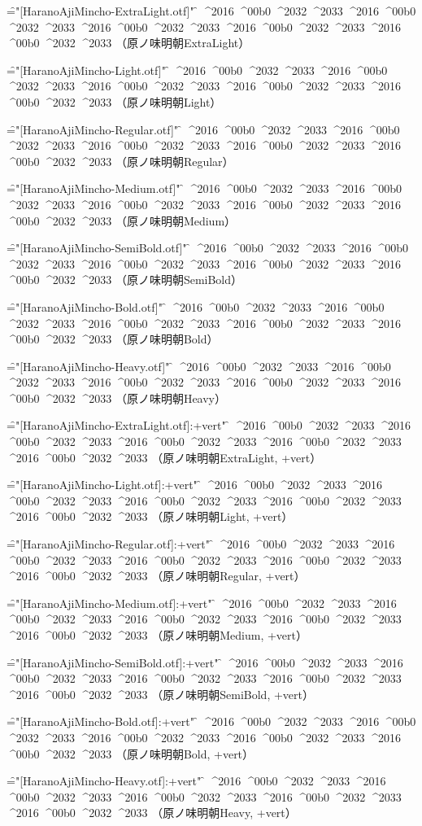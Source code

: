
\nopagenumbers

\def\test{%
^^^^2016%
^^^^00b0%
^^^^2032%
^^^^2033}

\def\testAll{\test \test \test \test \test}


\font\f="[HaranoAjiMincho-ExtraLight.otf]" \f
\testAll
（原ノ味明朝ExtraLight）\par

\font\f="[HaranoAjiMincho-Light.otf]" \f
\testAll
（原ノ味明朝Light）\par

\font\f="[HaranoAjiMincho-Regular.otf]" \f
\testAll
（原ノ味明朝Regular）\par

\font\f="[HaranoAjiMincho-Medium.otf]" \f
\testAll
（原ノ味明朝Medium）\par

\font\f="[HaranoAjiMincho-SemiBold.otf]" \f
\testAll
（原ノ味明朝SemiBold）\par

\font\f="[HaranoAjiMincho-Bold.otf]" \f
\testAll
（原ノ味明朝Bold）\par

\font\f="[HaranoAjiMincho-Heavy.otf]" \f
\testAll
（原ノ味明朝Heavy）\par


\font\f="[HaranoAjiMincho-ExtraLight.otf]:+vert" \f
\testAll
（原ノ味明朝ExtraLight, +vert）\par

\font\f="[HaranoAjiMincho-Light.otf]:+vert" \f
\testAll
（原ノ味明朝Light, +vert）\par

\font\f="[HaranoAjiMincho-Regular.otf]:+vert" \f
\testAll
（原ノ味明朝Regular, +vert）\par

\font\f="[HaranoAjiMincho-Medium.otf]:+vert" \f
\testAll
（原ノ味明朝Medium, +vert）\par

\font\f="[HaranoAjiMincho-SemiBold.otf]:+vert" \f
\testAll
（原ノ味明朝SemiBold, +vert）\par

\font\f="[HaranoAjiMincho-Bold.otf]:+vert" \f
\testAll
（原ノ味明朝Bold, +vert）\par

\font\f="[HaranoAjiMincho-Heavy.otf]:+vert" \f
\testAll
（原ノ味明朝Heavy, +vert）\par


